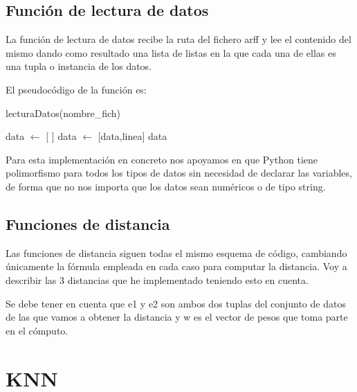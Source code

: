 \documentclass[12pt,a4paper]{article}
\begin{document}
	\subsection{Función de lectura de datos}

	La función de lectura de datos recibe la ruta del fichero arff y lee el contenido del mismo dando como resultado una lista de listas en la que cada una de ellas es una tupla o instancia de los datos.

	El pseudocódigo de la función es:

	\begin{algorithm}
		\caption{lecturaDatos(nombre\_fich)}
		\label{algoritmoLecturaDatos}
		\begin{algorithmic}
			\STATE data $\leftarrow$ [ ]
					\STATE data $\leftarrow$ [data,linea]
				\ENDIF
			\ENDFOR
			\RETURN data
		\end{algorithmic}
	\end{algorithm}

	Para esta implementación en concreto nos apoyamos en que Python tiene polimorfismo para todos los tipos de datos sin necesidad de declarar las variables, de forma que no nos importa que los datos sean numéricos o de tipo string.

	\subsection{Funciones de distancia}

	Las funciones de distancia siguen todas el mismo esquema de código, cambiando únicamente la fórmula empleada en cada caso para computar la distancia. Voy a describir las 3 distancias que he implementado teniendo esto en cuenta.

	Se debe tener en cuenta que e1 y e2 son ambos dos tuplas del conjunto de datos de las que vamos a obtener la distancia y w es el vector de pesos que toma parte en el cómputo.



	\section{KNN}
	\label{sec:knn}
\end{document}
